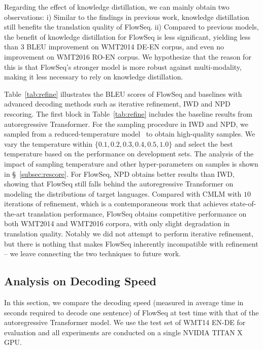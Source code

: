 \documentclass[11pt,a4paper]{article}
\begin{document}
Regarding the effect of knowledge distillation, we can mainly obtain two observations: i)
Similar to the findings in previous work, knowledge distillation still benefits the translation quality of FlowSeq. 
ii) Compared to previous models, the benefit of knowledge distillation for FlowSeq is less significant, yielding less than $3$ BLEU improvement on WMT2014 DE-EN corpus, and even no improvement on WMT2016 RO-EN corpus.
We hypothesize that the reason for this is that FlowSeq's stronger model is more robust against multi-modality, making it less necessary to rely on knowledge distillation.

Table~\ref{tab:refine} illustrates the BLEU scores of FlowSeq and baselines with advanced decoding methods such as iterative refinement, IWD and NPD rescoring.
The first block in Table~\ref{tab:refine} includes the baseline results from autoregressive Transformer.
For the sampling procedure in IWD and NPD, we sampled from a reduced-temperature model~\citep{kingma2018glow} to obtain high-quality samples.
We vary the temperature within $\{0.1, 0.2, 0.3, 0.4, 0.5, 1.0\}$ and select the best temperature based on the performance on development sets.
The analysis of the impact of sampling temperature and other hyper-parameters on samples is shown in \S~\ref{subsec:rescore}.
For FlowSeq, NPD obtains better results than IWD, showing that FlowSeq still falls behind the autoregressive Transformer on modeling the distributions of target languages.
Compared with CMLM \citep{constant2019} with $10$ iterations of refinement, which is a contemporaneous work that achieves state-of-the-art translation performance, FlowSeq obtains competitive performance on both WMT2014 and WMT2016 corpora, with only slight degradation in translation quality.
Notably we did not attempt to perform iterative refinement, but there is nothing that makes FlowSeq inherently incompatible with refinement -- we leave connecting the two techniques to future work.

\subsection{Analysis on Decoding Speed}
In this section, we compare the decoding speed (measured in average time in seconds required to decode one sentence) of FlowSeq at test time with that of the autoregressive Transformer model. 
We use the test set of WMT14 EN-DE for evaluation and all experiments are conducted on a single NVIDIA TITAN X GPU.
\vspace{-1mm}
\end{document}
